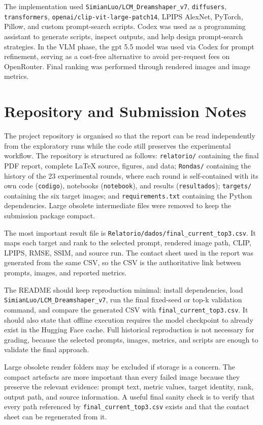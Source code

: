 \documentclass[runningheads]{llncs}
\newcommand{\modelname}{\texttt{SimianLuo/LCM\_Dreamshaper\_v7}}
\newcommand{\clipmodel}{\texttt{openai/clip-vit-large-patch14}}
\begin{document}
The implementation used \modelname, \texttt{diffusers}, \texttt{transformers}, \clipmodel, LPIPS AlexNet, PyTorch, Pillow, and custom prompt-search scripts. Codex was used as a programming assistant to generate scripts, inspect outputs, and help design prompt-search strategies. In the VLM phase, the gpt 5.5 model was used via Codex for prompt refinement, serving as a cost-free alternative to avoid per-request fees on OpenRouter. Final ranking was performed through rendered images and image metrics.

\section*{Repository and Submission Notes}

The project repository is organised so that the report can be read independently from the exploratory runs while the code still preserves the experimental workflow. The repository is structured as follows: \texttt{relatorio/} containing the final PDF report, complete LaTeX source, figures, and data; \texttt{Rondas/} containing the history of the 23 experimental rounds, where each round is self-contained with its own code (\texttt{codigo}), notebooks (\texttt{notebook}), and results (\texttt{resultados}); \texttt{targets/} containing the six target images; and \texttt{requirements.txt} containing the Python dependencies. Large obsolete intermediate files were removed to keep the submission package compact.

The most important result file is \texttt{Relatorio/dados/final\_current\_top3.csv}. It maps each target and rank to the selected prompt, rendered image path, CLIP, LPIPS, RMSE, SSIM, and source run. The contact sheet used in the report was generated from the same CSV, so the CSV is the authoritative link between prompts, images, and reported metrics.

The README should keep reproduction minimal: install dependencies, load \modelname, run the final fixed-seed or top-k validation command, and compare the generated CSV with \texttt{final\_current\_top3.csv}. It should also state that offline execution requires the model checkpoint to already exist in the Hugging Face cache. Full historical reproduction is not necessary for grading, because the selected prompts, images, metrics, and scripts are enough to validate the final approach.

Large obsolete render folders may be excluded if storage is a concern. The compact artefacts are more important than every failed image because they preserve the relevant evidence: prompt text, metric values, target identity, rank, output path, and source information. A useful final sanity check is to verify that every path referenced by \texttt{final\_current\_top3.csv} exists and that the contact sheet can be regenerated from it.
\end{document}
